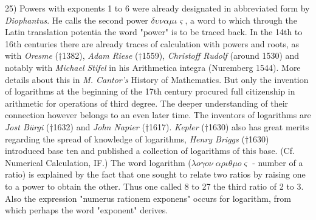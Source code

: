 \vfill
\leftline{\rule{2in}{0.4pt}}
\vspace{0.2cm}
{
\footnotesize
25) Powers with exponents 1 to 6 were already designated in abbreviated form by \textit{Diophantus}. He calls the second power $\delta\upsilon\nu\alpha\mu\iota\varsigma$, a word to which through the Latin translation potentia the word "power" is to be traced back. In the 14th to 16th centuries there are already traces of calculation with powers and roots, as with \textit{Oresme} (†1382), \textit{Adam Riese} (†1559), \textit{Christoff Rudolf} (around 1530) and notably with \textit{Michael Stifel} in his Arithmetica integra (Nuremberg 1544). More details about this in \textit{M. Cantor's} History of Mathematics. But only the invention of logarithms at the beginning of the 17th century procured full citizenship in arithmetic for operations of third degree. The deeper understanding of their connection however belongs to an even later time. The inventors of logarithms are \textit{Jost Bürgi} (†1632) and \textit{John Napier} (†1617). \textit{Kepler} (†1630) also has great merits regarding the spread of knowledge of logarithms, \textit{Henry Briggs} (†1630) introduced base ten and published a collection of logarithms of this base. (Cf. Numerical Calculation, IF.) The word logarithm ($\lambda o\gamma o\nu \; \alpha\rho\iota\theta\mu o\varsigma$ - number of a ratio) is explained by the fact that one sought to relate two ratios by raising one to a power to obtain the other. Thus one called 8 to 27 the third ratio of 2 to 3. Also the expression "numerus rationem exponens" occurs for logarithm, from which perhaps the word "exponent" derives.

}
